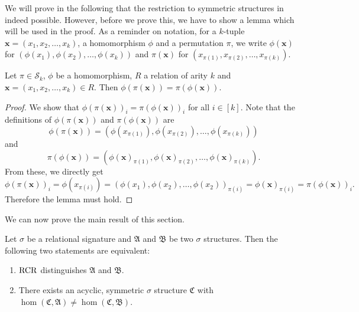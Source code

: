 We will prove in the following that the restriction to symmetric structures in indeed possible.
However, before we prove this, we have to show a lemma which will be used in the proof.
As a reminder on notation, for a $k$-tuple $\mathbf x=(x_1,x_2,\dots,x_k)$, a homomorphism $\phi$ and a permutation $\pi$, we write $\phi(\mathbf x)$ for $(\phi(x_1),\phi(x_2),\dots,\phi(x_k))$ and $\pi(\mathbf x)$ for $(x_{\pi(1)},x_{\pi(2)},\dots,x_{\pi(k)})$.
\begin{lemma}
	Let $\pi\in\mathcal S_k$, $\phi$ be a homomorphism, $R$ a relation of arity $k$ and $\mathbf x=(x_1,x_2,\dots,x_k)\in R$.
	Then $\phi(\pi(\mathbf x))=\pi(\phi(\mathbf x))$.
	\label{HomAndPermutCommute}
\end{lemma}
\begin{proof}
	We show that $\phi(\pi(\mathbf x))_i=\pi(\phi(\mathbf x))_i$ for all $i\in [k]$.
	Note that the definitions of $\phi(\pi(\mathbf x))$ and $\pi(\phi(\mathbf x))$ are 
	$$\phi(\pi(\mathbf x)) = (\phi(x_{\pi(1)}), \phi(x_{\pi(2)}),\dots,\phi(x_{\pi(k)}))$$
	and
	$$\pi(\phi(\mathbf x)) = (\phi(\mathbf x)_{\pi(1)},\phi(\mathbf x)_{\pi(2)},\dots,\phi(\mathbf x)_{\pi(k)}).$$
	From these, we directly get
	$$\phi(\pi(\mathbf x))_i=\phi(x_{\pi(i)})=(\phi(x_1),\phi(x_2),\dots,\phi(x_2))_{\pi(i)}=\phi(\mathbf x)_{\pi(i)}=\pi(\phi(\mathbf x))_i.$$
	Therefore the lemma must hold.
\end{proof}
We can now prove the main result of this section.
\begin{theorem}
	\label{thm:ThmD}
	Let $\sigma$ be a relational signature and $\mathfrak A$ and $\mathfrak B$ be two $\sigma$ structures.
	Then the following two statements are equivalent:
	\begin{enumerate}
		\item $\operatorname{RCR}$ distinguishes $\mathfrak A$ and $\mathfrak B$.
		\item There exists an acyclic, symmetric $\sigma$ structure $\mathfrak C$ with $\hom(\mathfrak C,\mathfrak A)\neq \hom(\mathfrak C,\mathfrak B)$.
	\end{enumerate}
\end{theorem}
